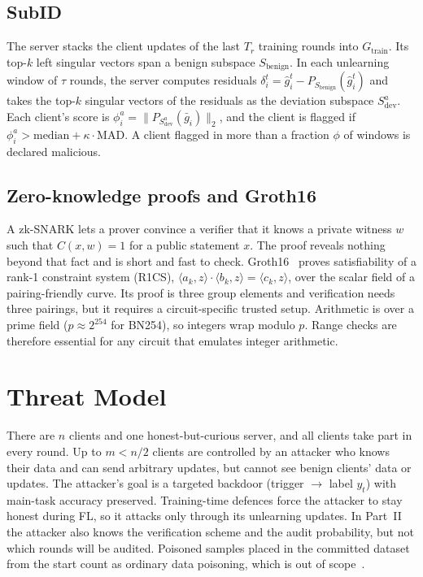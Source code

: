 \documentclass[conference]{IEEEtran}
\begin{document}
\subsection{SubID~\cite{fusion}}
The server stacks the client updates of the last $T_r$ training rounds into $G_{\text{train}}$. Its
top-$k$ left singular vectors span a benign subspace $S_{\text{benign}}$. In each unlearning window
of $\tau$ rounds, the server computes residuals $\delta_i^t=\hat g_i^t-P_{S_{\text{benign}}}(\hat g_i^t)$
and takes the top-$k$ singular vectors of the residuals as the deviation subspace $S^a_{\text{dev}}$.
Each client's score is $\phi^a_i=\|P_{S^a_{\text{dev}}}(\bar g_i)\|_2$, and the client is flagged if
$\phi_i^a>\text{median}+\kappa\cdot\text{MAD}$. A client flagged in more than a fraction $\phi$ of
windows is declared malicious.

\subsection{Zero-knowledge proofs and Groth16}
A zk-SNARK lets a prover convince a verifier that it knows a private witness $w$ such that
$C(x,w)=1$ for a public statement $x$. The proof reveals nothing beyond that fact and is short and
fast to check. Groth16~\cite{groth16} proves satisfiability of a rank-1 constraint system (R1CS),
$\langle a_k,z\rangle\cdot\langle b_k,z\rangle=\langle c_k,z\rangle$, over the scalar field of a
pairing-friendly curve. Its proof is three group elements and verification needs three pairings,
but it requires a circuit-specific trusted setup. Arithmetic is over a prime field
($p\approx2^{254}$ for BN254), so integers wrap modulo $p$. Range checks are therefore essential for
any circuit that emulates integer arithmetic.

\section{Threat Model}
There are $n$ clients and one honest-but-curious server, and all clients take part in every round.
Up to $m<n/2$ clients are controlled by an attacker who knows their data and can send arbitrary
updates, but cannot see benign clients' data or updates. The attacker's goal is a targeted backdoor
(trigger $\to$ label $y_t$) with main-task accuracy preserved. Training-time defences force the
attacker to stay honest during FL, so it attacks only through its unlearning updates. In Part~II
the attacker also knows the verification scheme and the audit probability, but not which rounds
will be audited. Poisoned samples placed in the committed dataset from the start count as ordinary
data poisoning, which is out of scope~\cite{zkdesign}.
\end{document}
